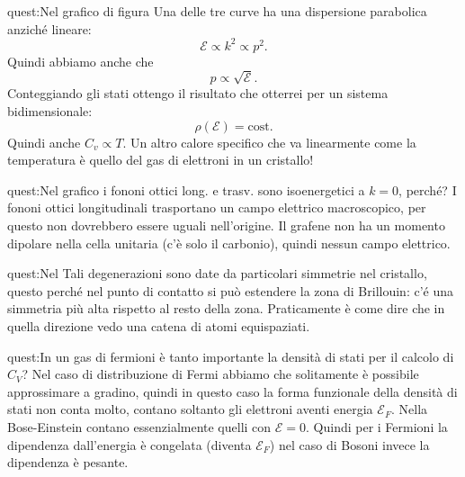 \begin{quest}{quest:Nel grafico di figura}
Una delle tre curve ha una dispersione parabolica anziché lineare:
\[
    \mathcal{E}\propto k^2  \propto  p^2
.\] 
Quindi abbiamo anche che 
\[
    p \propto  \sqrt{\mathcal{E}} 
.\] 
Conteggiando gli stati ottengo il risultato che otterrei per un sistema bidimensionale:
\[
    \rho (\mathcal{E}) = \text{cost}
.\] 
Quindi anche $C_v\propto T$. Un altro calore specifico che va linearmente come la temperatura è quello del gas di elettroni in un cristallo!
\end{quest}
\begin{quest}[Nel grafico \ref{fig:figures-dipersione_grafene-png} i fononi ottici long. e trasv. sono isoenergetici a $k=0$, perché?]{quest:Nel grafico i fononi ottici long. e trasv. sono isoenergetici a $k=0$, perché?}
    I fononi ottici longitudinali trasportano un campo elettrico macroscopico, per questo non dovrebbero essere uguali nell'origine. Il grafene non ha un momento dipolare nella cella unitaria (c'è solo il carbonio), quindi nessun campo elettrico.
\end{quest}
\begin{quest}{quest:Nel }
Tali degenerazioni sono date da particolari simmetrie nel cristallo, questo perché nel punto di contatto si può estendere la zona di Brillouin: c'é una simmetria più alta rispetto al resto della zona. Praticamente è come dire che in quella direzione vedo una catena di atomi equispaziati.
\end{quest}
\begin{quest}{quest:In un gas di fermioni è tanto importante la densità di stati per il calcolo di $C_V$?}
Nel caso di distribuzione di Fermi abbiamo che solitamente è possibile approssimare a gradino, quindi in questo caso la forma funzionale della densità di stati non conta molto, contano soltanto gli elettroni aventi energia $\mathcal{E}_F$. 
Nella Bose-Einstein contano essenzialmente quelli con $\mathcal{E} =0$. Quindi per i Fermioni la dipendenza dall'energia è congelata (diventa $\mathcal{E}_F$) nel caso di Bosoni invece la dipendenza è pesante.
\end{quest}

